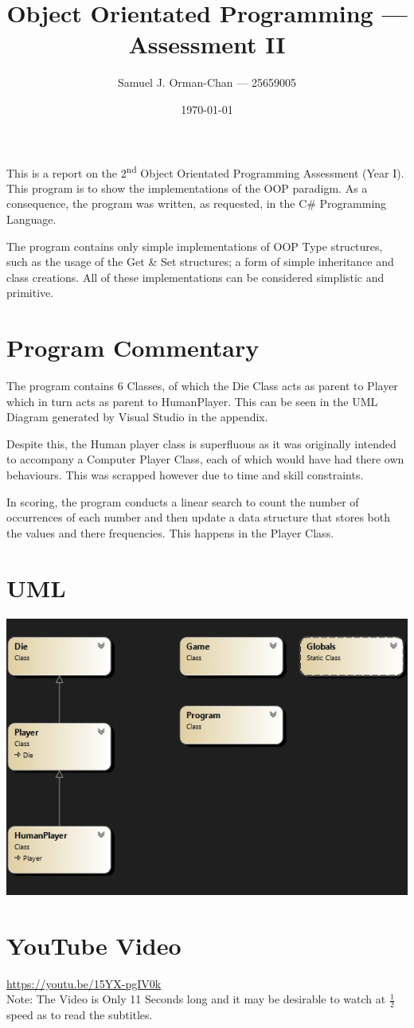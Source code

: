 \documentclass[11pt]{article} %
\title{Object Orientated Programming --- Assessment II}
\author{Samuel J. Orman-Chan --- 25659005}
\date{\today} %
\begin{document}
\maketitle

This is a report on the 2\textsuperscript{nd} Object Orientated Programming Assessment (Year I). This program is to show the implementations of the OOP paradigm. As a consequence, the program was written, as requested, in the C\# Programming Language. \par
The program contains only simple implementations of OOP Type structures, such as the usage of the Get \& Set structures; a form of simple inheritance and class creations. All of these implementations can be considered simplistic and primitive. \par
\section{Program Commentary}
The program contains 6 Classes, of which the Die Class acts as parent to Player which in turn acts as parent to HumanPlayer. This can be seen in the UML Diagram generated by Visual Studio in the appendix.\par
Despite this, the Human player class is superfluous as it was originally intended to accompany a Computer Player Class, each of which would have had there own behaviours. This was scrapped however due to time and skill constraints. \par
In scoring, the program conducts a linear search to count the number of occurrences of each number and then update a data structure that stores both the values and there frequencies. This happens in the Player Class.\par

\appendix
\section{UML}
\includegraphics{UML1.jpg}
\section{YouTube Video}
\url{https://youtu.be/15YX-pgIV0k}\\
Note: The Video is Only 11 Seconds long and it may be desirable to watch at $\frac{1}{2}$ speed as to read the subtitles.
\end{document}
